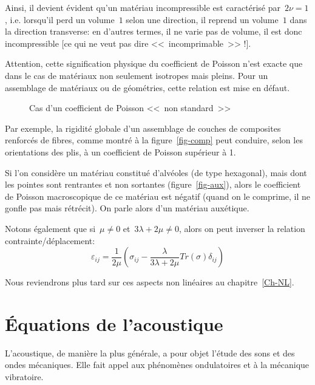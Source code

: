 Ainsi, il devient évident qu'un matériau incompressible
est caractérisé par~$2\nu=1$,
i.e. lorsqu'il perd un volume~$1$ selon une direction, il reprend un volume~$1$ dans
la direction transverse: en d'autres termes, il ne varie pas de volume, il est donc
incompressible [ce qui ne veut pas dire <<~incomprimable~>> !].

\medskip
Attention, cette signification physique du coefficient de Poisson n'est exacte que dans le cas 
de matériaux non seulement isotropes mais pleins.
Pour un assemblage de matériaux ou de géométries, cette relation est mise en
défaut.

\begin{wrapfigure}{r}{108mm}
  \centering
   \hfill
  \caption{Cas d'un coefficient de Poisson <<~non standard~>>}
\end{wrapfigure}
Par exemple, la rigidité globale d'un assemblage de couches de composites
renforcés de fibres, comme montré à la figure~\ref{fig-comp} peut conduire, selon les orientations des plis, à un coefficient
de Poisson supérieur à 1.

Si l'on considère un matériau constitué d'alvéoles (de type hexagonal), mais dont
les pointes sont rentrantes et non sortantes (figure~\ref{fig-aux}), alors le coefficient de Poisson macroscopique 
de ce matériau est négatif (quand on le comprime, il ne gonfle pas mais rétrécit).
On parle alors d'un matériau auxétique.

\medskip
Notons également que si~$\mu\ne0$ et~$3\lambda+2\mu\ne0$, alors on peut inverser la
relation contrainte/dé\-pla\-ce\-ment:
\begin{equation}
\varepsilon_{ij}=\dfrac1{2\mu}\left(\sigma_{ij}-\dfrac\lambda{3\lambda+2\mu}Tr(\sigma)\delta_{ij}\right)
\end{equation}

\medskip
Nous reviendrons plus tard sur ces aspects non linéaires au chapitre~\ref{Ch-NL}.


\medskip
\section{Équations de l'acoustique}
L'acoustique, de manière la plus générale, a pour objet l'étude des sons et des ondes mécaniques. 
Elle fait appel aux phénomènes ondulatoires et à la mécanique vibratoire.


